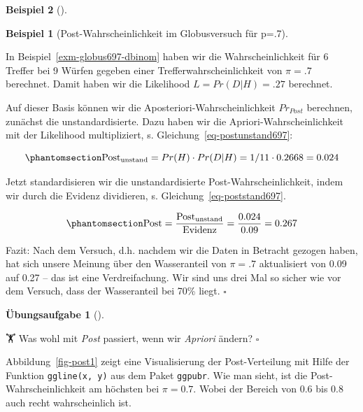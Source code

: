 \documentclass[
  ngerman,
  letterpaper,
  twoside,
  open=any]{scrbook}
\theoremstyle{definition}
\newtheorem{example}{Beispiel}[chapter]
\theoremstyle{plain}
\theoremstyle{definition}
\newtheorem{exercise}{Übungsaufgabe}[chapter]
\theoremstyle{definition}
\theoremstyle{remark}
\begin{document}
\begin{example}[]
\begin{example}[Post-Wahrscheinlichkeit im Globusversuch für
p=.7]\protect\hypertarget{exm-globus697-post}{}\label{exm-globus697-post}

In Beispiel~\ref{exm-globus697-dbinom} haben wir die Wahrscheinlichkeit
für 6 Treffer bei 9 Würfen gegeben einer Trefferwahrscheinlichkeit von
\(\pi = .7\) berechnet. Damit haben wir die Likelihood
\(L = Pr(D|H) =.27\) berechnet.

Auf dieser Basis können wir die Aposteriori-Wahrscheinlichkeit
\(Pr_{Post}\) berechnen, zunächst die unstandardisierte. Dazu haben wir
die Apriori-Wahrscheinlichkeit mit der Likelihood multipliziert, s.
Gleichung~\ref{eq-postunstand697}:

\begin{equation}\protect\phantomsection\label{eq-postunstand697}{
\text{Post}_{\text{unstand}} = Pr(H) \cdot Pr(D|H) = 1/11 \cdot 0.2668 = 0.024
}\end{equation}

Jetzt standardisieren wir die unstandardisierte Post-Wahrscheinlichkeit,
indem wir durch die Evidenz dividieren, s.
Gleichung~\ref{eq-poststand697}.

\begin{equation}\protect\phantomsection\label{eq-poststand697}{\text{Post} = \frac{\text{Post}_{\text{unstand}}}{\text{Evidenz}} = \frac{0.024}{0.09} = 0.267}\end{equation}

Fazit: Nach dem Versuch, d.h. nachdem wir die Daten in Betracht gezogen
haben, hat sich unsere Meinung über den Wasseranteil von \(\pi=.7\)
aktualisiert von 0.09 auf 0.27 -- das ist eine Verdreifachung. Wir sind
uns drei Mal so sicher wie vor dem Versuch, dass der Wasseranteil bei
70\% liegt. \(\square\)

\end{example}

\begin{exercise}[]\protect\hypertarget{exr-priori-change}{}\label{exr-priori-change}

🏋️ Was wohl mit \emph{Post} passiert, wenn wir \emph{Apriori} ändern?
\(\square\)

\end{exercise}

Abbildung~\ref{fig-post1} zeigt eine Visualisierung der Post-Verteilung
mit Hilfe der Funktion \texttt{ggline(x,\ y)} aus dem Paket
\texttt{ggpubr}. Wie man sieht, ist die Post-Wahrscheinlichkeit am
höchsten bei \(\pi=0.7\). Wobei der Bereich von 0.6 bis 0.8 auch recht
wahrscheinlich ist.


\end{example}
\end{document}
